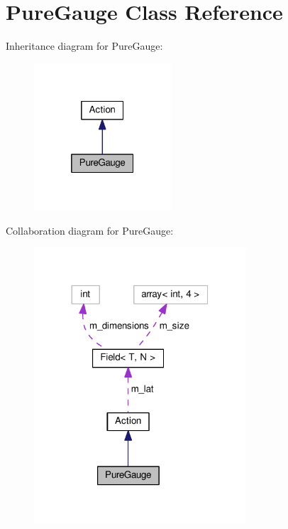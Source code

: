 \hypertarget{classPureGauge}{}\section{Pure\+Gauge Class Reference}
\label{classPureGauge}


Inheritance diagram for Pure\+Gauge\+:\nopagebreak
\begin{figure}[H]
\begin{center}
\leavevmode
\includegraphics[width=145pt]{classPureGauge__inherit__graph}
\end{center}
\end{figure}


Collaboration diagram for Pure\+Gauge\+:\nopagebreak
\begin{figure}[H]
\begin{center}
\leavevmode
\includegraphics[width=224pt]{classPureGauge__coll__graph}
\end{center}
\end{figure}
